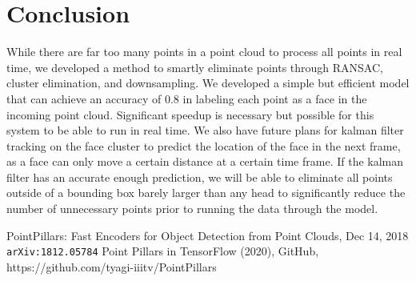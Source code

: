 \documentclass{article}
\begin{document}
\section{Conclusion}
While there are far too many points in a point cloud to process all points in real time, we developed a method to smartly eliminate points through RANSAC, cluster elimination, and downsampling. We developed a simple but efficient model that can achieve an accuracy of 0.8 in labeling each point as a face in the incoming point cloud. Significant speedup is necessary but possible for this system to be able to run in real time. We also have future plans for kalman filter tracking on the face cluster to predict the location of the face in the next frame, as a face can only move a certain distance at a certain time frame. If the kalman filter has an accurate enough prediction, we will be able to eliminate all points outside of a bounding box barely larger than any head to significantly reduce the number of unnecessary points prior to running the data through the model. 
\begin{thebibliography}{9}
PointPillars: Fast Encoders for Object Detection from Point Clouds, Dec 14, 2018
\\\texttt{arXiv:1812.05784}
Point Pillars in TensorFlow (2020), GitHub, https://github.com/tyagi-iiitv/PointPillars
\end{thebibliography}
\end{document}
